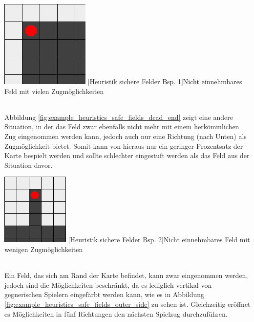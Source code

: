 \documentclass[12pt,a4paper,bibliography=totocnumbered,listof=totocnumbered]{article}
\begin{document}
\vspace{1em}
\begin{minipage}{\linewidth}
	\centering
	\includegraphics[width=0.3\linewidth]{pics/heuristics_safe_fields_corner.png}
	[Heuristik sichere Felder Bsp. 1]{Nicht einnehmbares Feld mit vielen Zugmöglichkeiten}
	\label{fig:example_heuristics_safe_fields_corner}
\end{minipage}
\\

Abbildung \ref{fig:example_heuristics_safe_fields_dead_end} zeigt eine andere Situation, in der das Feld zwar ebenfalls nicht mehr mit einem herkömmlichen Zug eingenommen werden kann, jedoch auch nur eine Richtung (nach Unten) als Zugmöglichkeit bietet. Somit kann von hieraus nur ein geringer Prozentsatz der Karte bespielt werden und sollte schlechter eingestuft werden als das Feld aus der Situation davor.

\vspace{1em}
\begin{minipage}{\linewidth}
	\centering
	\includegraphics[width=0.3\linewidth]{pics/heuristics_safe_fields_dead_end.png}
	[Heuristik sichere Felder Bsp. 2]{Nicht einnehmbares Feld mit wenigen Zugmöglichkeiten}
	\label{fig:example_heuristics_safe_fields_dead_end}
\end{minipage}
\\

Ein Feld, das sich am Rand der Karte befindet, kann zwar eingenommen werden, jedoch sind die Möglichkeiten beschränkt, da es lediglich vertikal von gegnerischen Spielern eingefärbt werden kann, wie es in Abbildung \ref{fig:example_heuristics_safe_fields_outer_side} zu sehen ist. Gleichzeitig eröffnet es Möglichkeiten in fünf Richtungen den nächsten Spielzug durchzuführen.
\end{document}
